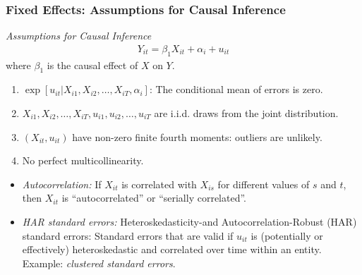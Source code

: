 

\begin{frame}
\frametitle{Fixed Effects: Assumptions for Causal Inference}
\emph{Assumptions for Causal Inference}
\begin{align*}
Y_{it} = \beta_{1} X_{it} + \alpha_{i} + u_{it}
\end{align*}
where $\beta_{1}$ is the causal effect of $X$ on $Y$. 
\begin{enumerate}
\item $\exp[u_{it}|X_{i1},X_{i2},\ldots,X_{iT},\alpha_{i}]$: The conditional mean of errors is zero.
\item $X_{i1},X_{i2},\ldots,X_{iT},u_{i1},u_{i2},\ldots,u_{iT}$ are i.i.d. draws from the joint distribution.
\item $(X_{it}, u_{it})$ have non-zero finite fourth moments: outliers are unlikely.
\item No perfect multicollinearity. 
\end{enumerate}
\begin{itemize}
\item \emph{Autocorrelation:} 
\newline
If $X_{it}$ is correlated with $X_{is}$ for different values of $s$ and $t$, then $X_{it}$ is ``autocorrelated'' or ``serially correlated''. 
\item \emph{HAR standard errors:}
\newline
Heteroskedasticity-and Autocorrelation-Robust (HAR) standard errors:
\newlinequad
Standard errors that are valid if $u_{it}$ is (potentially or effectively) heteroskedastic and correlated over time within an entity. Example: \emph{clustered standard errors}.
\end{itemize}
\end{frame}
